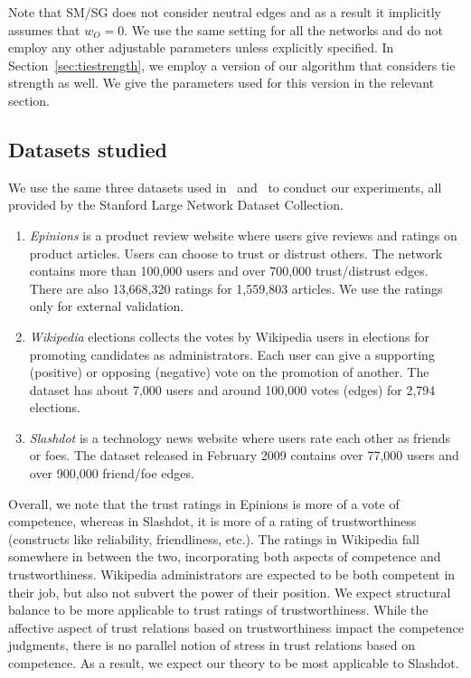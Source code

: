 \documentclass[acmtweb]{acmsmall}
\begin{document}
Note that SM/SG does not consider neutral edges and as a result it
implicitly assumes that $w_{O}=0$.  We use the same setting for all
the networks and do not employ any other adjustable parameters unless
explicitly specified. In Section~\ref{sec:tiestrength}, we employ a
version of our algorithm that considers tie strength as well. We give
the parameters used for this version in the relevant section.


\subsection{Datasets studied}
We use the same three datasets used
in~\cite{golbeck:distrust2011} and~\cite{Leskovec:2010} to conduct our
experiments, all provided by the Stanford Large Network Dataset
Collection. 

\begin{enumerate}
\item {\em Epinions} is a product review website where users give
  reviews and ratings on product articles. Users can choose to trust
  or distrust others. The network contains more than 100,000 users and
  over 700,000 trust/distrust edges. There are also 13,668,320 ratings
  for 1,559,803 articles. We use the ratings only for external
  validation. 

\item {\em Wikipedia} elections collects the votes by Wikipedia users in
  elections for promoting candidates as administrators. Each user can
  give a supporting (positive) or opposing (negative) vote on the
  promotion of another. The dataset has about 7,000 users and around
  100,000 votes (edges) for 2,794 elections.

\item {\em Slashdot} is a technology news website where users rate
  each other as friends or foes. The dataset released in February 2009
  contains over 77,000 users and over 900,000 friend/foe edges. 
\end{enumerate}

Overall, we note that the trust ratings in Epinions is more of a vote
of competence, whereas in Slashdot, it is more of a rating of
trustworthiness (constructs like reliability, friendliness, etc.). The
ratings in Wikipedia fall somewhere in between the two, incorporating
both aspects of competence and trustworthiness. Wikipedia
administrators are expected to be both competent in their job, but
also not subvert the power of their position. We expect 
structural balance to be more applicable to trust ratings of
trustworthiness. While the affective aspect of trust relations based
on trustworthiness impact the competence judgments, there is no
parallel notion of stress in trust relations based on competence. As a
result, we expect our theory to be most applicable to Slashdot.
\end{document}
